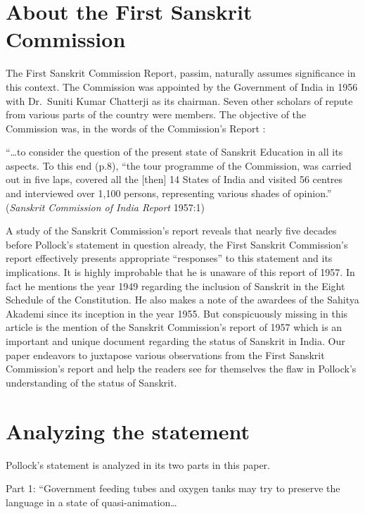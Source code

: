 \section{About the First Sanskrit Commission}

The First Sanskrit Commission Report, passim, naturally assumes significance in this context. The Commission was appointed by the Government of India in 1956 with Dr.\ Suniti Kumar Chatterji as its chairman. Seven other scholars of repute from various parts of the country were members. The objective of the Commission was, in the words of the Commission’s Report :
\smallskip

\begin{myquote}
\eleven
“…to consider the question of the present state of Sanskrit Education in all its aspects. To this end (p.8), “the tour programme of the Commission, was carried out in five laps, covered all the [then] 14 States of India and  visited 56 centres and interviewed over 1,100 persons, representing various shades of opinion.” \hfill({\sl Sanskrit Commission of India Report} 1957:1)
\end{myquote}
\smallskip

A study of the Sanskrit Commission’s report reveals that nearly five decades before Pollock’s statement in question already, the First Sanskrit Commission’s report effectively presents appropriate “responses” to this statement and its implications. It is highly improbable that he is unaware of this report of 1957. In fact he mentions the year 1949 regarding the inclusion of Sanskrit in the Eight Schedule of the Constitution. He also makes a note of the awardees of the Sahitya Akademi since its inception in the year 1955. But conspicuously missing in this article is the mention of the Sanskrit Commission’s report of 1957 which is an important and unique document regarding the status of Sanskrit in India.  Our paper endeavors to  juxtapose various observations from the First Sanskrit Commission’s report and help the readers see for themselves the flaw in Pollock’s understanding of the status of Sanskrit.

\section{Analyzing the statement}

Pollock’s statement is analyzed in its two parts in this paper. 

Part 1:  “Government feeding tubes and oxygen tanks may try to preserve the language in a state of quasi-animation…

